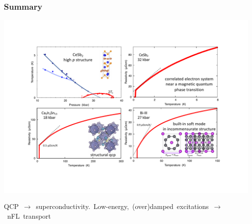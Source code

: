 

\begin{emptyframe}
\frametitle{Summary}
\centerline{\includegraphics[width=\columnwidth]{EndingPicture4.pdf}}
\mbox{\small QCP $\rightarrow$ superconductivity. Low-energy, (over)damped excitations $\rightarrow$ nFL transport}




\end{emptyframe}
{}

